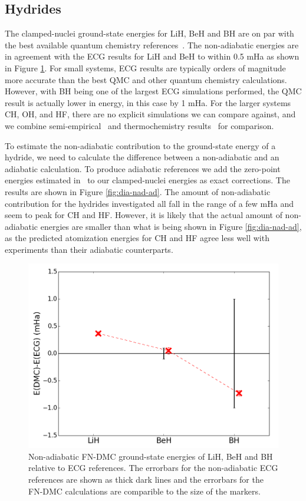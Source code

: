 \documentclass[pra,superscriptaddress,groupedaddress,twocolumn]{revtex4}
\begin{document}
\subsection{Hydrides}



The clamped-nuclei ground-state energies for LiH, BeH and BH are on par with the best available quantum chemistry references~\cite{Adamowicz_LiH,Koput_BeH,Miliordos_BH}. The non-adiabatic energies are in agreement with the ECG results for LiH and BeH to within 0.5 mHa as shown in Figure \ref{fig:dia-ECG}. For small systems, ECG results are typically orders of magnitude more accurate than the best QMC and other quantum chemistry calculations. However, with BH being one of the largest ECG simulations performed, the QMC result is actually lower in energy, in this case by 1 mHa. For the larger systems CH, OH, and HF, there are no explicit simulations we can compare against, and we combine semi-empirical~\cite{Davidson_Atoms} and thermochemistry results~\cite{Feller_Corrections} for comparison.

To estimate the non-adiabatic contribution to the ground-state energy of a hydride, we need to calculate the difference between a non-adiabatic and an adiabatic calculation. To produce adiabatic references we add the zero-point energies estimated in~\cite{Feller_Corrections} to our clamped-nuclei energies as exact corrections. The results are shown in Figure \ref{fig:dia-nad-ad}. The amount of non-adiabatic contribution for the hydrides investigated all fall in the range of a few mHa and seem to peak for CH and HF. However, it is likely that the actual amount of non-adiabatic energies are smaller than what is being shown in Figure \ref{fig:dia-nad-ad}, as the predicted atomization energies for CH and HF agree less well with experiments than their adiabatic counterparts.

\begin{figure}[h]
\centering
\includegraphics[scale=.37]{Figures/dia-ECG}
\caption{Non-adiabatic FN-DMC ground-state energies of LiH, BeH and BH relative to ECG references. The errorbars for the non-adiabatic ECG references are shown as thick dark lines and the errorbars for the FN-DMC calculations are comparible to the size of the markers. \label{fig:dia-ECG}}
\end{figure}
\end{document}
